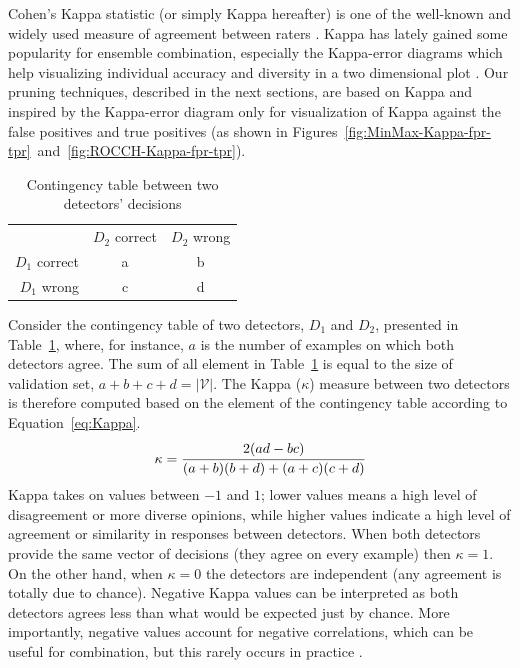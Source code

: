 Cohen's Kappa statistic (or simply Kappa hereafter) is one of the well-known and widely used measure of agreement between raters \cite{Cohen1995a}.
Kappa has lately gained some popularity for ensemble combination, especially the Kappa-error diagrams which help visualizing individual accuracy and diversity in a two dimensional plot \cite{Margineantu1997,Kunchev2013}.
Our pruning techniques, described in the next sections, are based on Kappa and inspired by the Kappa-error diagram only for visualization of Kappa against the false positives and true positives (as shown in Figures~\ref{fig:MinMax-Kappa-fpr-tpr}~and~\ref{fig:ROCCH-Kappa-fpr-tpr}).

\begin{table}[tbh]
    \normalsize
    \centering
    \renewcommand{\arraystretch}{1.3}
    \caption{Contingency table between two detectors' decisions}
    \label{Table::Contigency}
    \centering
    \begin{tabular}{ r|c|c| }
        \multicolumn{1}{r}{}
	 &  \multicolumn{1}{c}{$D_2$ correct}
	 & \multicolumn{1}{c}{$D_2$ wrong} \\
	\cline{2-3}
	$D_1$ correct & a & b \\
	\cline{2-3}
	$D_1$ wrong & c & d \\
	\cline{2-3}
    \end{tabular}
\end{table}

Consider the contingency table of two detectors, $D_1$ and $D_2$, presented in Table~\ref{Table::Contigency}, where, for instance, $a$ is the number of examples on which both detectors agree.
The sum of all element in Table~\ref{Table::Contigency} is equal to the size of validation set, $a+b+c+d=|\mathcal{V}|$.
The Kappa ($\kappa$) measure between two detectors is therefore computed based on the element of the contingency table according to Equation~\ref{eq:Kappa}.
\begin{equation}
  \kappa =  \cfrac{2(ad-bc)}{(a+b)(b+d) + (a+c)(c+d) }
  \label{eq:Kappa}
\end{equation}
Kappa takes on values between $-1$ and $1$; lower values means a high level of disagreement or more diverse opinions, while higher values indicate a high level of agreement or similarity in responses between detectors.
When both detectors provide the same vector of decisions (they agree on every example) then $\kappa=1$.
On the other hand, when $\kappa=0$ the detectors are independent (any agreement is totally due to chance).
Negative Kappa values can be interpreted as both detectors agrees less than what would be expected just by chance.
More importantly, negative values account for negative correlations, which can be useful for combination, but this rarely occurs in practice \cite{Margineantu1997}.  %


